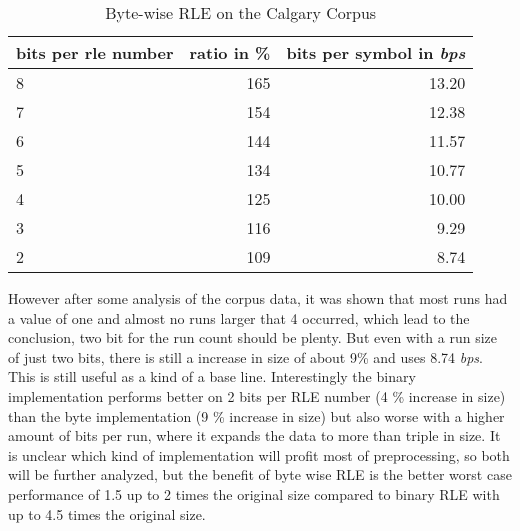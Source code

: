 \begin{table}[h]
	\centering
	\begin{tabular}{l|r|r}
		\label{tab:t5 run length eval}
		
		bits per rle number &  ratio in \% & bits per symbol in \textit{bps}\\
		\hline
		8 & 165 & 13.20 \\
		7 & 154 & 12.38\\
		6 & 144 & 11.57 \\
		5 & 134 & 10.77\\
		4 & 125 & 10.00\\
		3 & 116 & 9.29\\
		2 & 109 & 8.74 \\
	\end{tabular}
	\caption{Byte-wise RLE on the Calgary Corpus}
\end{table}


\par{
 However after some analysis of the corpus data, it was shown that most runs had a value of one and almost no runs larger that 4 occurred, which lead to the conclusion, two bit for the run count should be plenty. But even with a run size of just two bits, there is still a increase in size of about 9\% and uses 8.74 \textit{bps}. This is still useful as a kind of a base line. Interestingly the binary implementation performs better on 2 bits per RLE number (4 \% increase in size) than the byte implementation (9 \% increase in size) but also worse with a higher amount of bits per run, where it expands the data to more than triple in size. It is unclear which kind of implementation will profit most of preprocessing, so both will be further analyzed, but the benefit of byte wise RLE is the better worst case performance of 1.5 up to 2 times the original size compared to binary RLE with up to 4.5 times the original size.
}

